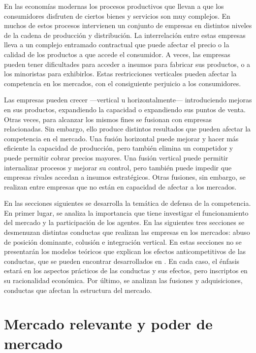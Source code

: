 \documentclass[
  12pt,
  spanish,
]{book}
\begin{document}
En las economías modernas los procesos productivos que llevan a que los
consumidores disfruten de ciertos bienes y servicios son muy complejos.
En muchos de estos procesos intervienen un conjunto de empresas en
distintos niveles de la cadena de producción y distribución. La
interrelación entre estas empresas lleva a un complejo entramado
contractual que puede afectar el precio o la calidad de los productos a
que accede el consumidor. A veces, las empresas pueden tener
dificultades para acceder a insumos para fabricar sus productos, o a los
minoristas para exhibirlos. Estas restricciones verticales pueden
afectar la competencia en los mercados, con el consiguiente perjuicio a
los consumidores.

Las empresas pueden crecer ---vertical u horizontalmente---
introduciendo mejoras en sus productos, expandiendo la capacidad o
expandiendo sus puntos de venta. Otras veces, para alcanzar los mismos
fines se fusionan con empresas relacionadas. Sin embargo, ello produce
distintos resultados que pueden afectar la competencia en el mercado.
Una fusión horizontal puede mejorar y hacer más eficiente la capacidad
de producción, pero también elimina un competidor y puede permitir
cobrar precios mayores. Una fusión vertical puede permitir internalizar
procesos y mejorar su control, pero también puede impedir que empresas
rivales accedan a insumos estratégicos. Otras fusiones, sin embargo, se
realizan entre empresas que no están en capacidad de afectar a los
mercados.

En las secciones siguientes se desarrolla la temática de defensa de la
competencia. En primer lugar, se analiza la importancia que tiene
investigar el funcionamiento del mercado y la participación de los
agentes. En las siguientes tres secciones se desmenuzan distintas
conductas que realizan las empresas en los mercados: abuso de posición
dominante, colusión e integración vertical. En estas secciones no se
presentarán los modelos teóricos que explican los efectos
anticompetitivos de las conductas, que se pueden encontrar desarrollados
en \citet{Motta2004}. En cada caso, el énfasis estará en los aspectos
prácticos de las conductas y sus efectos, pero inscriptos en su
racionalidad económica. Por último, se analizan las fusiones y
adquisiciones, conductas que afectan la estructura del mercado.

\hypertarget{mercado-relevante-y-poder-de-mercado}{%
\section{Mercado relevante y poder de
mercado}\label{mercado-relevante-y-poder-de-mercado}}
\end{document}

